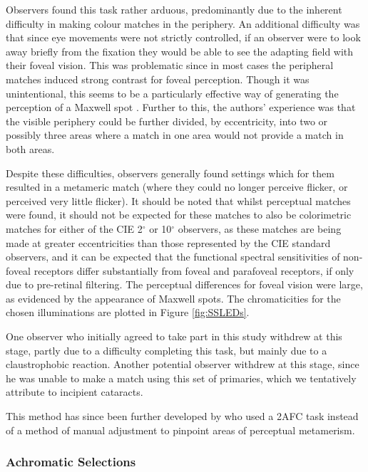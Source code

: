 Observers found this task rather arduous, predominantly due to the inherent difficulty in making colour matches in the periphery. An additional difficulty was that since eye movements were not strictly controlled, if an observer were to look away briefly from the fixation they would be able to see the adapting field with their foveal vision. This was problematic since in most cases the peripheral matches induced strong contrast for foveal perception. Though it was unintentional, this seems to be a particularly effective way of generating the perception of a Maxwell spot \citep{isobe_functional_1955}. Further to this, the authors' experience was that the visible periphery could be further divided, by eccentricity, into two or possibly three areas where a match in one area would not provide a match in both areas.

Despite these difficulties, observers generally found settings which for them resulted in a metameric match (where they could no longer perceive flicker, or perceived very little flicker). It should be noted that whilst perceptual matches were found, it should not be expected for these matches to also be colorimetric matches for either of the \gls{CIE} 2$^{\circ}$ or 10$^{\circ}$ observers, as these matches are being made at greater eccentricities than those represented by the \gls{CIE} standard observers, and it can be expected that the functional spectral sensitivities of non-foveal receptors differ substantially from foveal and parafoveal receptors, if only due to pre-retinal filtering. The perceptual differences for foveal vision were large, as evidenced by the appearance of Maxwell spots. The chromaticities for the chosen illuminations are plotted in Figure \ref{fig:SSLEDs}.

One observer who initially agreed to take part in this study withdrew at this stage, partly due to a difficulty completing this task, but mainly due to a claustrophobic reaction. Another potential observer withdrew at this stage, since he was unable to make a match using this set of primaries, which we tentatively attribute to incipient cataracts.

This method has since been further developed by \citet{allen_form_2019} who used a 2AFC task instead of a method of manual adjustment to pinpoint areas of perceptual metamerism.

\subsubsection{Achromatic Selections}

